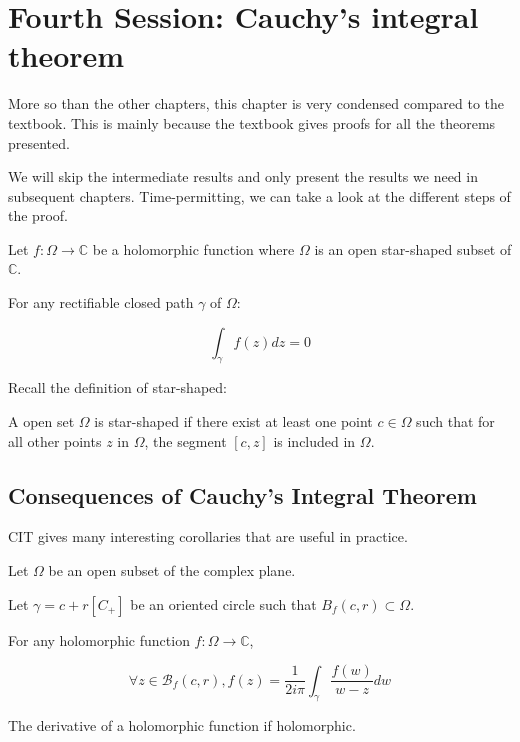\section{Fourth Session: Cauchy's integral theorem}
More so than the other chapters, this chapter is very condensed compared to the textbook. This is mainly because the textbook gives proofs for all the theorems presented.

We will skip the intermediate results and only present the results we need in subsequent chapters. Time-permitting, we can take a look at the different steps of the proof.

\begin{thm*}
    Let $f: \Omega \rightarrow \mathbb{C}$ be a holomorphic function where $\Omega$ is an open star-shaped subset of $\mathbb{C}$.

    For any rectifiable closed path $\gamma$ of $\Omega$:

    $$ \int_\gamma f(z)dz = 0 $$
\end{thm*}

Recall the definition of star-shaped:

\begin{defi}
    A open set $\Omega$ is star-shaped if there exist at least one point $c\in\Omega$ such that for all other points $z$ in $\Omega$, the segment $[c, z]$ is included in $\Omega$.
\end{defi}

\subsection*{Consequences of Cauchy's Integral Theorem}
CIT gives many interesting corollaries that are useful in practice.


\begin{thm*}
    Let $\Omega$ be an open subset of the complex plane. 

    Let $\gamma = c + r[C_+]$ be an oriented circle such that $B_f(c, r) \subset \Omega$.

    For any holomorphic function $f: \Omega \rightarrow \mathbb{C}$, 

    $$\forall z\in\mathcal{B}_f(c, r), f(z) = \frac{1}{2i\pi}\int_\gamma \frac{f(w)}{w - z}dw$$
\end{thm*}


\begin{thm*}
    The derivative of a holomorphic function if holomorphic.
\end{thm*}


